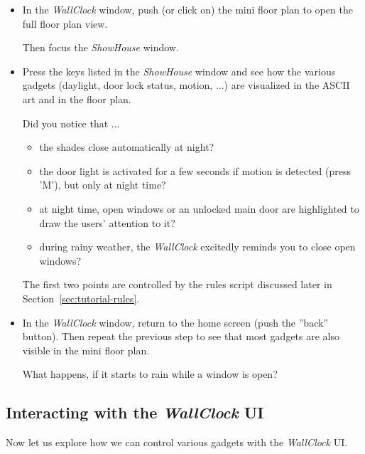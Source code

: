\documentclass[12pt,english,parskip=half,headheight=19pt]{scrreprt}
\begin{document}
\begin{itemize}[$\blacktriangleright$]

  \item
    In the \textit{WallClock} window, push (or click on) the mini floor plan to open the full floor
    plan view.

    Then focus the \textit{ShowHouse} window.

  \item
    Press the keys listed in the \textit{ShowHouse} window and see how the various gadgets
    (daylight, door lock status, motion, ...) are visualized in the ASCII art and in the floor plan.

    Did you notice that ...
    \begin{itemize}
      \item the shades close automatically at night?
      \item the door light is activated for a few seconds if motion is detected (press 'M'),
        but only at night time?
      \item at night time, open windows or an unlocked main door are highlighted to draw the
        users' attention to it?
      \item during rainy weather, the \textit{WallClock} excitedly reminds you to close open windows?
    \end{itemize}

    The first two points are controlled by the rules script discussed later in
    Section~\ref{sec:tutorial-rules}.

  \item
    In the \textit{WallClock} window, return to the home screen (push the ''back'' button).
    Then repeat the previous step to see that most gadgets are also visible in the
    mini floor plan.

    What happens, if it starts to rain while a window is open?

\end{itemize}


\subsection{Interacting with the \textit{WallClock} UI}
\label{sec:tutorial-firststeps-wallclock_ui}

Now let us explore how we can control various gadgets with the \textit{WallClock} UI.
\end{document}
